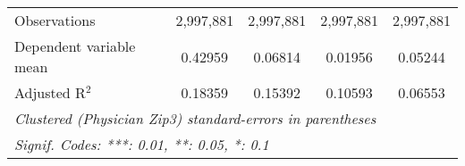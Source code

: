 \begin{table}[htbp]
\begin{threeparttable}[b]
\begin{tabular}{lcccc}
         Observations            & 2,997,881      & 2,997,881      & 2,997,881     & 2,997,881\\  
         Dependent variable mean & 0.42959        & 0.06814        & 0.01956       & 0.05244\\  
         Adjusted R$^2$          & 0.18359        & 0.15392        & 0.10593       & 0.06553\\  
         \midrule \midrule
         \multicolumn{5}{l}{\emph{Clustered (Physician Zip3) standard-errors in parentheses}}\\
         \multicolumn{5}{l}{\emph{Signif. Codes: ***: 0.01, **: 0.05, *: 0.1}}\\
      \end{tabular}
   \end{threeparttable}
\end{table}


